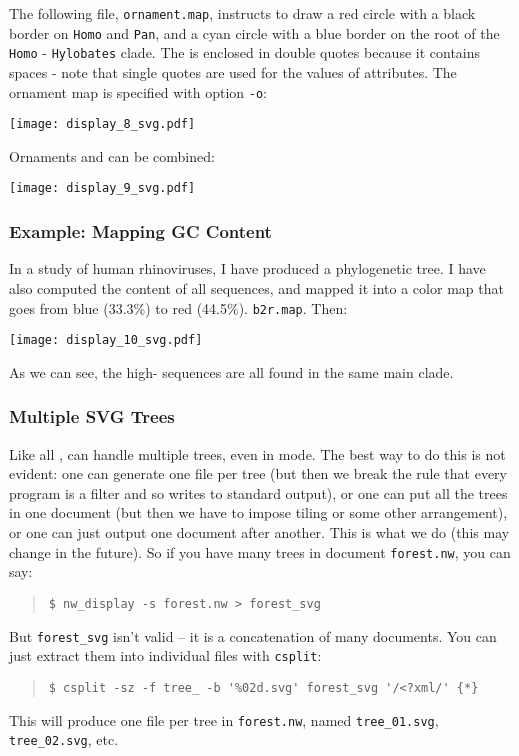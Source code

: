The following file, \texttt{ornament.map}, instructs to draw a red circle with
a black border on \texttt{Homo} and \texttt{Pan}, and a cyan circle with a blue
border on the root of the \texttt{Homo} - \texttt{Hylobates} clade. The \svg{}
is enclosed in double quotes because it contains spaces - note that single
quotes are used for the values of \xml{} attributes. The ornament map is
specified with option \texttt{-o}:
\begin{quote}
 
\end{quote}

\begin{center}
 \texttt{[image: display\_8\_svg.pdf]}
\end{center}
Ornaments and \css{} can be combined:

\begin{center}
 \texttt{[image: display\_9\_svg.pdf]}
\end{center}

\subsubsection{Example: Mapping GC Content}

In a study of human rhinoviruses, I have produced a phylogenetic tree. I have
also computed the \gc{} content of all sequences, and mapped it into a color
map that goes from {\color{Blue} blue} (33.3\%) to {\color{Red} red} (44.5\%).
\texttt{b2r.map}. Then:


\texttt{[image: display\_10\_svg.pdf]}
\bigskip{}

\noindent{}As we can see, the high-\gc{} sequences are all found in the same main clade.

\subsubsection{Multiple SVG Trees}

Like all \nutils, \display{} can handle multiple trees, even in \svg{} mode.
The best way to do this is not evident: one can generate one file per tree (but
then we break the rule that every program is a filter and so writes to standard
output), or one can put all the trees in one \svg{} document (but then we have
to impose tiling or some other arrangement), or one can just output one \svg{}
document after another. This is what we do (this may change in the future). So
if you have many trees in document \texttt{forest.nw}, you can say:
\begin{quote}
\verb+$ nw_display -s forest.nw > forest_svg+
\end{quote}
But \texttt{forest\_svg} isn't valid \svg{} -- it is a concatenation of many \svg{} documents. You can just extract them into individual files with \texttt{csplit}:
\begin{quote}
\verb+$ csplit -sz -f tree_ -b '%02d.svg' forest_svg '/<?xml/' {*}+
\end{quote}
This will produce one \svg{} file per tree in \texttt{forest.nw}, named \texttt{tree\_01.svg}, \texttt{tree\_02.svg}, etc.

